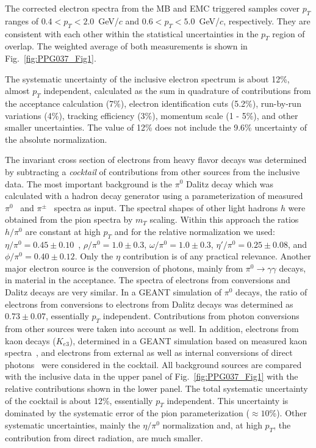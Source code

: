 \documentclass[aps,prl,superscriptaddress,showpacs,floatfix,twocolumn]{revtex4}
\begin{document}
The corrected electron spectra from the MB and EMC triggered samples cover 
$p_T$ ranges of $0.4 < p_T < 2.0$~GeV/$c$ and $0.6 < p_T < 5.0$~GeV/$c$, 
respectively. 
They are consistent with each other within the statistical uncertainties 
in the $p_T$ region of overlap. 
The weighted average of both measurements is shown in 
Fig.~\ref{fig:PPG037_Fig1}. 

The systematic uncertainty of the inclusive electron spectrum is about 12\%, 
almost $p_T$ independent, calculated as the sum in quadrature of contributions 
from the acceptance calculation (7\%), electron identification cuts (5.2\%), 
run-by-run variations (4\%), tracking efficiency (3\%), momentum scale 
(1 - 5\%), and other smaller uncertainties. 
The value of 12\% does not include the 9.6\% uncertainty of the absolute 
normalization.

The invariant cross section of electrons from heavy flavor decays was 
determined by subtracting a {\it cocktail} of contributions from other 
sources from the inclusive data.
The most important background is the $\pi^0$ Dalitz decay which was 
calculated with a hadron decay generator using a parameterization of measured 
$\pi^0$~\cite{phenix_pi0pp} and $\pi^\pm$~\cite{phenix_pichargepp} spectra 
as input. 
The spectral shapes of other light hadrons $h$ were obtained from the pion 
spectra by $m_T$ scaling. 
Within this approach the ratios $h/\pi^0$ are constant at high $p_T$ and for 
the relative normalization we used: 
$\eta/\pi^0 = 0.45 \pm 0.10$~\cite{phenix_ppg051}, $\rho/\pi^0 = 1.0 \pm 0.3$, 
$\omega/\pi^0 = 1.0 \pm 0.3$, $\eta'/\pi^0 = 0.25 \pm 0.08$, and 
$\phi/\pi^0 = 0.40 \pm 0.12$. 
Only the $\eta$ contribution is of any practical relevance. 
Another major electron source is the conversion of photons, mainly from 
$\pi^0 \rightarrow \gamma\gamma$ decays, in material in the acceptance. 
The spectra of electrons from conversions and Dalitz decays are very 
similar.
In a GEANT simulation of $\pi^0$ decays, the ratio of electrons from 
conversions to electrons from Dalitz decays was determined as 
$0.73 \pm 0.07$, essentially $p_T$ independent. 
Contributions from photon conversions from other sources were taken 
into account as well. 
In addition, electrons from kaon decays ($K_{e3}$), determined in a GEANT 
simulation based on measured kaon spectra~\cite{phenix_pichargepp}, and 
electrons from external as well as internal conversions of direct 
photons~\cite{vogelsang,phenix_directgammapp} were considered in the cocktail.
All background sources are compared with the inclusive data in the upper panel 
of Fig.~\ref{fig:PPG037_Fig1} with the relative contributions shown in the 
lower panel. 
The total systematic uncertainty of the cocktail is about 12\%, essentially 
$p_T$ independent. 
This uncertainty is dominated by the systematic error of the pion 
parameterization ($\approx 10$\%). 
Other systematic uncertainties, mainly the $\eta/\pi^0$ normalization and, 
at high $p_T$, the contribution from direct radiation, are much smaller.
\end{document}
